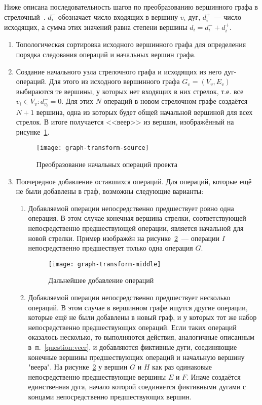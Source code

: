 Ниже описана последовательность шагов по преобразованию вершинного графа в стрелочный~\cite{VSU-5y}. $d_i^-$ обозначает число входящих в вершину $v_i$ дуг, $d_i^+$~--- число исходящих, а сумма этих значений равна степени вершины $d_i=d_i^-+d_i^+$.
\begin{enumerate}
\label{ConversionAlgo}
	\item Топологическая сортировка исходного вершинного графа для определения порядка следования операций и начальных вершин графа.
	\item \label{question:veer} Создание начального узла стрелочного графа и исходящих из него дуг-операций. Для этого из исходного вершинного графа $ G_v = (V_v,E_v)$ выбираются те вершины, у которых нет входящих в них стрелок, т.е. все $v_i \in V_v: d_{v_i}^-=0$. Для этих $N$ операций в новом стрелочном графе создаётся $N+1$ вершина, одна из которых будет общей начальной вершиной для всех стрелок. В итоге получается <<веер>> из вершин, изображённый на рисунке~\ref{fig:graph-transform-source}.
	\begin{figure}[h!]
		\centering
		{
			\texttt{[image: graph-transform-source]}
		}
		\caption{Преобразование начальных операций проекта}
		\label{fig:graph-transform-source}
	\end{figure}
	\item Поочередное добавление оставшихся операций. Для операций, которые ещё не были добавлены в граф, возможны следующие варианты:
	\begin{enumerate}
		\item Добавляемой операции непосредственно предшествует ровно одна операция. В этом случае конечная вершина стрелки, соответствующей непосредственно предшествующей операции, является начальной для новой стрелки. Пример изображён на рисунке~\ref{fig:graph-transform-middle}~--- операции $I$ непосредственно предшествует только одна операция  $G$.
		\begin{figure}[h!]
			\centering
			{
				\texttt{[image: graph-transform-middle]}
			}
			\caption{Дальнейшее добавление операций}
			\label{fig:graph-transform-middle}
		\end{figure}
		\item Добавляемой операции непосредственно предшествует несколько операций. В этом случае в вершинном графе ищутся другие операции, которые ещё не были добавлены в новый граф, и у которых тот же набор непосредственно предшествующих операций. Если таких операций оказалось несколько, то выполняются действия, аналогичные описанным в~п.~\ref{question:veer}, и добавляются фиктивные дуги, соединяющие конечные вершины предшествующих операций и начальную вершину "веера". На рисунке~\ref{fig:graph-transform-middle} у вершин $G$ и $H$ как раз одинаковые непосредственно предшествующие вершины $E$ и $F$. Иначе создаётся единственная дуга, начало которой соединяется фиктивными дугами с концами непосредственно предшествующих вершин.

\end{enumerate}
\end{enumerate}
